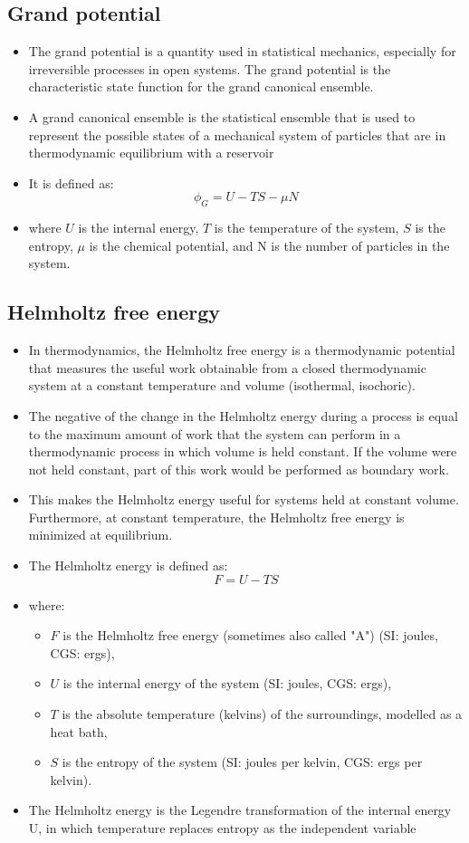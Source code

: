\documentclass[]{article}
\begin{document}
\subsection{Grand potential}
\begin{itemize}
\item The grand potential is a quantity used in statistical mechanics, especially for irreversible processes in open systems. The grand potential is the characteristic state function for the grand canonical ensemble. 
\item A grand canonical ensemble is the statistical ensemble that is used to represent the possible states of a mechanical system of particles that are in thermodynamic equilibrium with a reservoir
\item It is defined as: $$\phi_{G} = U - TS - \mu N$$
\item where $U$ is the internal energy, $T$ is the temperature of the system, $S$ is the entropy, $\mu$ is the chemical potential, and N is the number of particles in the system. 
\end{itemize}

\subsection{Helmholtz free energy}
\begin{itemize}
\item In thermodynamics, the Helmholtz free energy is a thermodynamic potential that measures the useful work obtainable from a closed thermodynamic system at a constant temperature and volume (isothermal, isochoric). 
\item The negative of the change in the Helmholtz energy during a process is equal to the maximum amount of work that the system can perform in a thermodynamic process in which volume is held constant. If the volume were not held constant, part of this work would be performed as boundary work. 
\item This makes the Helmholtz energy useful for systems held at constant volume. Furthermore, at constant temperature, the Helmholtz free energy is minimized at equilibrium. 
\item The Helmholtz energy is defined as: $$F = U - TS$$
\item where:
\begin{itemize}
\item $F$ is the Helmholtz free energy (sometimes also called "A") (SI: joules, CGS: ergs),
\item $U$ is the internal energy of the system (SI: joules, CGS: ergs),
\item $T$ is the absolute temperature (kelvins) of the surroundings, modelled as a heat bath,
\item $S$ is the entropy of the system (SI: joules per kelvin, CGS: ergs per kelvin).
\end{itemize}
\item The Helmholtz energy is the Legendre transformation of the internal energy U, in which temperature replaces entropy as the independent variable
\end{itemize}
\end{document}
